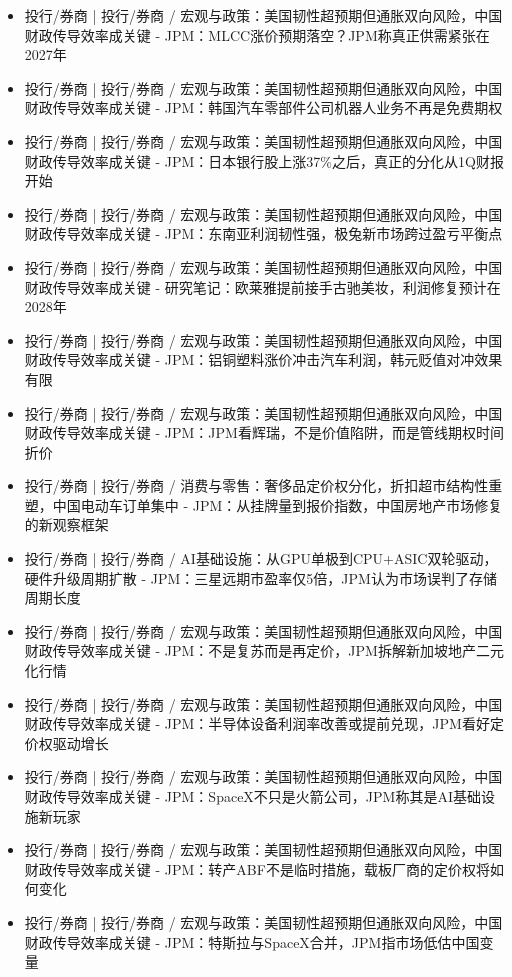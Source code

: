 \documentclass[11pt]{ctexart}
\begin{document}
\begin{itemize}
  \item [R013] 投行/券商 | 投行/券商 / 宏观与政策：美国韧性超预期但通胀双向风险，中国财政传导效率成关键 - JPM：MLCC涨价预期落空？JPM称真正供需紧张在2027年
  \item [R014] 投行/券商 | 投行/券商 / 宏观与政策：美国韧性超预期但通胀双向风险，中国财政传导效率成关键 - JPM：韩国汽车零部件公司机器人业务不再是免费期权
  \item [R015] 投行/券商 | 投行/券商 / 宏观与政策：美国韧性超预期但通胀双向风险，中国财政传导效率成关键 - JPM：日本银行股上涨37\%之后，真正的分化从1Q财报开始
  \item [R016] 投行/券商 | 投行/券商 / 宏观与政策：美国韧性超预期但通胀双向风险，中国财政传导效率成关键 - JPM：东南亚利润韧性强，极兔新市场跨过盈亏平衡点
  \item [R017] 投行/券商 | 投行/券商 / 宏观与政策：美国韧性超预期但通胀双向风险，中国财政传导效率成关键 - 研究笔记：欧莱雅提前接手古驰美妆，利润修复预计在2028年
  \item [R018] 投行/券商 | 投行/券商 / 宏观与政策：美国韧性超预期但通胀双向风险，中国财政传导效率成关键 - JPM：铝铜塑料涨价冲击汽车利润，韩元贬值对冲效果有限
  \item [R019] 投行/券商 | 投行/券商 / 宏观与政策：美国韧性超预期但通胀双向风险，中国财政传导效率成关键 - JPM：JPM看辉瑞，不是价值陷阱，而是管线期权时间折价
  \item [R020] 投行/券商 | 投行/券商 / 消费与零售：奢侈品定价权分化，折扣超市结构性重塑，中国电动车订单集中 - JPM：从挂牌量到报价指数，中国房地产市场修复的新观察框架
  \item [R021] 投行/券商 | 投行/券商 / AI基础设施：从GPU单极到CPU+ASIC双轮驱动，硬件升级周期扩散 - JPM：三星远期市盈率仅5倍，JPM认为市场误判了存储周期长度
  \item [R022] 投行/券商 | 投行/券商 / 宏观与政策：美国韧性超预期但通胀双向风险，中国财政传导效率成关键 - JPM：不是复苏而是再定价，JPM拆解新加坡地产二元化行情
  \item [R023] 投行/券商 | 投行/券商 / 宏观与政策：美国韧性超预期但通胀双向风险，中国财政传导效率成关键 - JPM：半导体设备利润率改善或提前兑现，JPM看好定价权驱动增长
  \item [R024] 投行/券商 | 投行/券商 / 宏观与政策：美国韧性超预期但通胀双向风险，中国财政传导效率成关键 - JPM：SpaceX不只是火箭公司，JPM称其是AI基础设施新玩家
  \item [R025] 投行/券商 | 投行/券商 / 宏观与政策：美国韧性超预期但通胀双向风险，中国财政传导效率成关键 - JPM：转产ABF不是临时措施，载板厂商的定价权将如何变化
  \item [R026] 投行/券商 | 投行/券商 / 宏观与政策：美国韧性超预期但通胀双向风险，中国财政传导效率成关键 - JPM：特斯拉与SpaceX合并，JPM指市场低估中国变量

\end{itemize}
\end{document}
